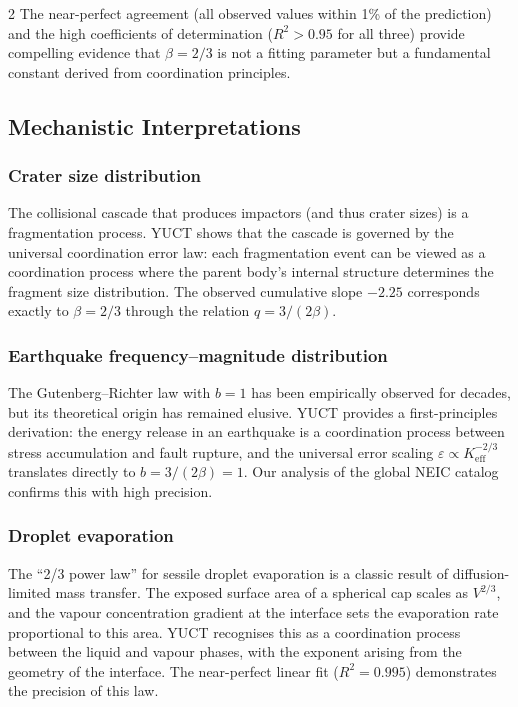 \documentclass[11pt,a4paper]{article}
\newcommand{\eps}{\varepsilon}
\newcommand{\Keff}{K_{\mathrm{eff}}}
\newcommand{\betaf}{\beta}
\begin{document}
\begin{multicols}{2}
		The near-perfect agreement (all observed values within 1\% of the prediction) and the high coefficients of determination (\(R^2 > 0.95\) for all three) provide compelling evidence that \(\betaf = 2/3\) is not a fitting parameter but a fundamental constant derived from coordination principles.
		
		\subsection{Mechanistic Interpretations}
		
		\subsubsection{Crater size distribution}
		The collisional cascade that produces impactors (and thus crater sizes) is a fragmentation process. YUCT shows that the cascade is governed by the universal coordination error law: each fragmentation event can be viewed as a coordination process where the parent body’s internal structure determines the fragment size distribution. The observed cumulative slope \(-2.25\) corresponds exactly to \(\betaf = 2/3\) through the relation \(q = 3/(2\betaf)\).
		
		\subsubsection{Earthquake frequency–magnitude distribution}
		The Gutenberg–Richter law with \(b = 1\) has been empirically observed for decades, but its theoretical origin has remained elusive. YUCT provides a first-principles derivation: the energy release in an earthquake is a coordination process between stress accumulation and fault rupture, and the universal error scaling \(\eps \propto \Keff^{-2/3}\) translates directly to \(b = 3/(2\betaf) = 1\). Our analysis of the global NEIC catalog confirms this with high precision.
		
		\subsubsection{Droplet evaporation}
		The “2/3 power law” for sessile droplet evaporation is a classic result of diffusion-limited mass transfer. The exposed surface area of a spherical cap scales as \(V^{2/3}\), and the vapour concentration gradient at the interface sets the evaporation rate proportional to this area. YUCT recognises this as a coordination process between the liquid and vapour phases, with the exponent arising from the geometry of the interface. The near-perfect linear fit (\(R^2 = 0.995\)) demonstrates the precision of this law.
		

\end{multicols}
\end{document}
